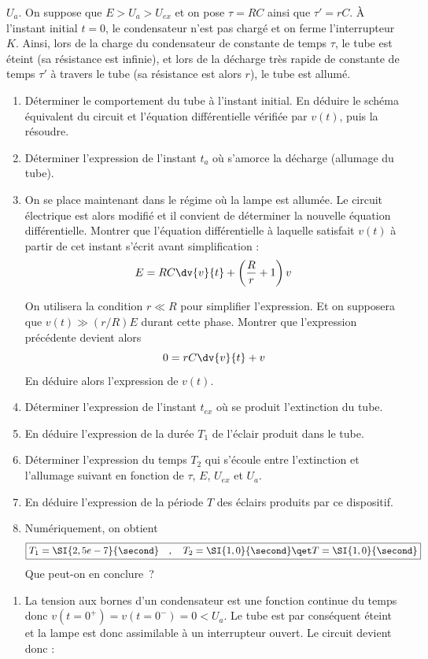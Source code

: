 \documentclass[a4paper, 10pt, garamond, oneside]{book}
\begin{document}
{	$U_{a}$.
	\bigbreak
	On suppose que $E > U_{a}  > U_{ex}$ et on pose $\tau = RC$ ainsi que
	$\tau' = rC$.
	\smallbreak
	À l'instant initial $t = 0$, le condensateur n'est pas chargé et on ferme
	l'interrupteur $K$.
	\bigbreak
	Ainsi, lors de la charge du condensateur de constante de temps $\tau$, le tube
	est éteint (sa résistance est infinie), et lors de la décharge très rapide de
	constante de temps $\tau'$ à travers le tube (sa résistance est alors $r$), le
	tube est allumé.
	\begin{enumerate}
		\item
		      Déterminer le comportement du tube à l'instant initial.
		      En déduire le schéma équivalent du circuit et l'équation différentielle vérifiée par $v(t)$, puis la résoudre.
		\item
		      Déterminer l'expression de l'instant $t_{a}$  où s'amorce la décharge (allumage du tube).
		\item
		      On se place maintenant dans le régime où la lampe est allumée. Le circuit électrique est alors modifié et il convient de déterminer la nouvelle équation différentielle. Montrer que l'équation différentielle à laquelle satisfait $v(t)$ à partir de cet instant s'écrit avant simplification :
		      \[
			      E = RC \dv{v}{t} + \left(\frac{R}{r}+1\right) v
		      \]

		      \noindent
		      On utilisera la condition $r \ll R$ pour simplifier l'expression. Et on supposera que $v(t) \gg (r/R)E$ durant cette phase. Montrer que l'expression précédente devient alors
		      \[
			      0 = rC \dv{v}{t} + v
		      \]
		      \noindent
		      En déduire alors l'expression de $v(t)$.
		\item
		      Déterminer l'expression de l'instant $t_{ex}$ où se produit l'extinction du tube.
		\item
		      En déduire l'expression de la durée $T_1$ de l'éclair produit dans le tube.
		\item
		      Déterminer l'expression du temps $T_2$ qui s'écoule entre l'extinction et l'allumage suivant en fonction de $\tau$, $E$, $U_{ex}$  et $U_{a}$.
		\item
		      En déduire l'expression de la période $T$ des éclairs produits par ce dispositif.
		\item
		      Numériquement, on obtient
		      \[
			      \boxed{	T_1 = \SI{2,5e-7}{\second} \quad , \quad T_2 = \SI{1,0}{\second} \qet T = \SI{1,0}{\second}}
		      \]
		      Que peut-on en conclure~?
	\end{enumerate}
}{
	\begin{enumerate}
		\item
		      La tension aux bornes d'un condensateur est une fonction continue du temps donc $v(t=0^+)=v(t=0^-)=0<U_{a}$. Le tube est par conséquent éteint et la lampe est donc assimilable à un interrupteur ouvert. Le circuit devient donc :


\end{enumerate}}
\end{document}
